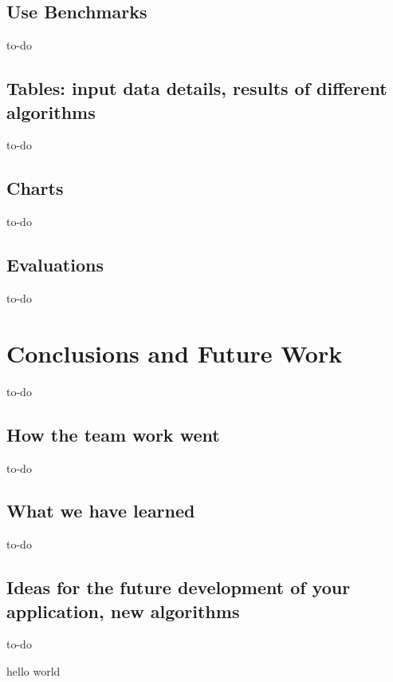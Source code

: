\documentclass[a4paper,12pt]{article}
\begin{document}
\subsection{Use Benchmarks}
to-do
\subsection{Tables: input data details, results of different algorithms}
to-do
\subsection{Charts}
to-do
\subsection{Evaluations}
to-do

\section{Conclusions and Future Work}
to-do
\subsection{How the team work went}
to-do
\subsection{What we have learned}
to-do
\subsection{Ideas for the future development of your application, new algorithms}
to-do

hello world
\end{document}
